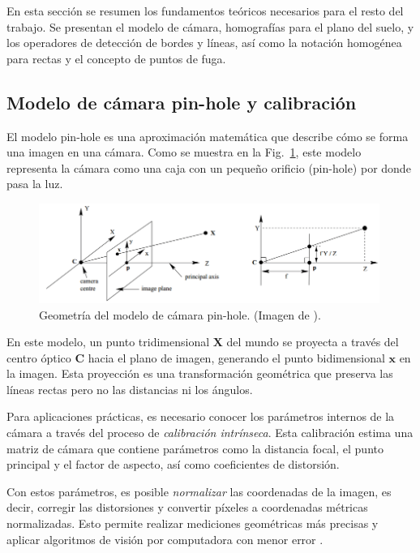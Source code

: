 En esta sección se resumen los fundamentos teóricos necesarios para el resto del trabajo. Se presentan el modelo de cámara, homografías para el plano del suelo, y los operadores de detección de bordes y líneas, así como la notación homogénea para rectas y el concepto de puntos de fuga.

\subsection{Modelo de cámara pin-hole y calibración}\label{subsec:camera}

El modelo pin-hole es una aproximación matemática que describe cómo se forma una imagen
en una cámara. Como se muestra en la Fig.~\ref{fig:pinhole-model}, este modelo representa
la cámara como una caja con un pequeño orificio (pin-hole) por donde pasa la luz.

\begin{figure}[!ht]
	\centering
	\includegraphics[width=0.99\textwidth]{img/2-mt/pinhole.png}
	\caption{Geometría del modelo de cámara pin-hole. (Imagen de \cite{hartley2003multiple}).}
	\label{fig:pinhole-model}
\end{figure}


En este modelo, un punto tridimensional \(\mathbf{X}\) del mundo se proyecta a través
del centro óptico \(\mathbf{C}\) hacia el plano de imagen, generando el punto bidimensional
\(\mathbf{x}\) en la imagen. Esta proyección es una transformación geométrica que preserva
las líneas rectas pero no las distancias ni los ángulos.


Para aplicaciones prácticas, es necesario conocer los parámetros internos de la cámara
a través del proceso de \emph{calibración intrínseca}. Esta calibración estima
una matriz de cámara que contiene parámetros como la distancia focal,
el punto principal y el factor de aspecto, así como coeficientes de distorsión.


Con estos parámetros, es posible \emph{normalizar} las coordenadas de la imagen,
es decir, corregir las distorsiones y convertir píxeles a coordenadas métricas normalizadas.
Esto permite realizar mediciones geométricas más precisas y aplicar algoritmos
de visión por computadora con menor error \cite{hartley2003multiple}.

